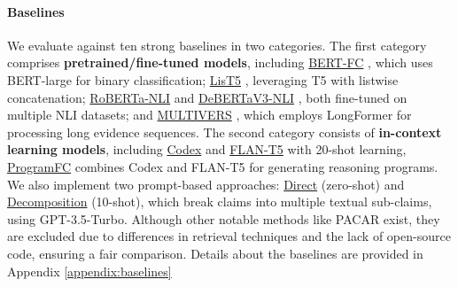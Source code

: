 \paragraph{Baselines}
We evaluate {\MyFC} against ten strong baselines in two categories. The first category comprises \textbf{pretrained/fine-tuned models}, including \underline{BERT-FC} \cite{soleimani2020bert}, which uses BERT-large for binary classification; \underline{LisT5} \cite{jiang2021exploring}, leveraging T5 with listwise concatenation; \underline{RoBERTa-NLI} \cite{nie2019combining} and \underline{DeBERTaV3-NLI} \cite{he2021debertav3}, both fine-tuned on multiple NLI datasets; and \underline{MULTIVERS} \cite{wadden2021multivers}, which employs LongFormer \cite{beltagy2020longformer} for processing long evidence sequences. The second category consists of \textbf{in-context learning models}, including \underline{Codex} \cite{chen2021evaluating} and \underline{FLAN-T5} \cite{chung2022scaling} with 20-shot learning, \underline{ProgramFC} \cite{pan2023fact} combines Codex and FLAN-T5 for generating reasoning programs. We also implement two prompt-based approaches: \underline{Direct} (zero-shot) and \underline{Decomposition} (10-shot), which break claims into multiple textual sub-claims, using GPT-3.5-Turbo. Although other notable methods like PACAR \cite{zhao2024pacar} exist, they are excluded due to differences in retrieval techniques and the lack of open-source code, ensuring a fair comparison. Details about the baselines are provided in Appendix \ref{appendix:baselines}



